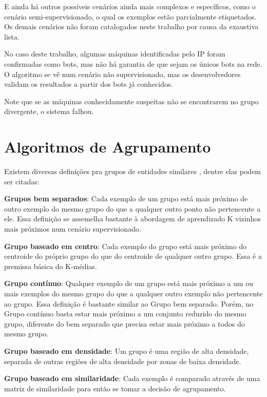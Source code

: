 E ainda há outros possíveis cenários ainda mais complexos e específicos, como o cenário semi-supervisionado, o qual os exemplos estão parcialmente etiquetados. Os demais cenários não foram catalogados neste trabalho por causa da exaustiva lista.

No caso deste trabalho, algumas máquinas identificadas pelo IP foram confirmadas como bots, mas não há garantia de que sejam os únicos bots na rede. O algoritmo se vê num cenário não supervisionado, mas os desenvolvedores validam os resultados a partir dos bots já conhecidos.

Note que se as máquinas conhecidamente suspeitas não se encontrarem no grupo divergente, o sistema falhou.

\section{Algoritmos de Agrupamento}

Existem diversas definições pra grupos de entidades similares \citep{faceli2011inteligencia}, dentre elas podem ser citadas:
\begin{description}
\item \textbf{Grupos bem separados}: Cada exemplo de um grupo está mais próximo de outro exemplo do mesmo grupo do que a qualquer outro ponto não pertencente a ele. Essa definição se assemelha bastante à abordagem de aprendizado K vizinhos mais próximos num cenário supervisionado.
\item \textbf{Grupo baseado em centro}: Cada exemplo do grupo está mais próximo do centroide do próprio grupo do que do centroide de qualquer outro grupo. Essa é a premissa básica do K-médias.
\item \textbf{Grupo contínuo}: Qualquer exemplo de um grupo está mais próximo a um ou mais exemplos do mesmo grupo do que a qualquer outro exemplo não pertencente ao grupo. Essa definição é bastante similar ao Grupo bem separado. Porém, no Grupo contínuo basta estar mais próximo a um conjunto reduzido do mesmo grupo, diferente do bem separado que precisa estar mais próximo a todos do mesmo grupo.
\item \textbf{Grupo baseado em densidade}: Um grupo é uma região de alta densidade, separada de outras regiões de alta densidade por zonas de baixa densidade.
\item \textbf{Grupo baseado em similaridade}: Cada exemplo é comparado através de uma matriz de similaridade para então se tomar a decisão de agrupamento.
\end{description}

